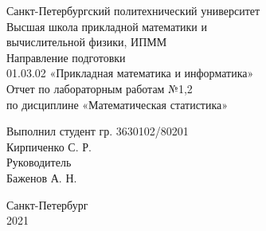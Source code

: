 \documentclass[a4paper,12pt]{article} %
\begin{document}

\large
\begin{center}
    Санкт-Петербургский политехнический университет\\
    Высшая школа прикладной математики и\\вычислительной физики, ИПММ\\
    \vspace{5em}
    Направление подготовки\\
    01.03.02 «Прикладная математика и информатика»\\
    \vspace{3em}
    Отчет по лабораторным работам №1,2\\
    по дисциплине «Математическая статистика»
    \vspace{15em}
\end{center}
Выполнил студент гр. 3630102/80201\\
Кирпиченко С. Р.\\
Руководитель\\
Баженов А. Н.
\vspace{7em}
\begin{center}
    Санкт-Петербург\\
    2021
\end{center}
\thispagestyle{empty}
\newpage
\tableofcontents
{}
\newpage
\listoffigures
{}
\newpage
\listoftables
{}
\thispagestyle{empty}
\newpage
\end{document}
